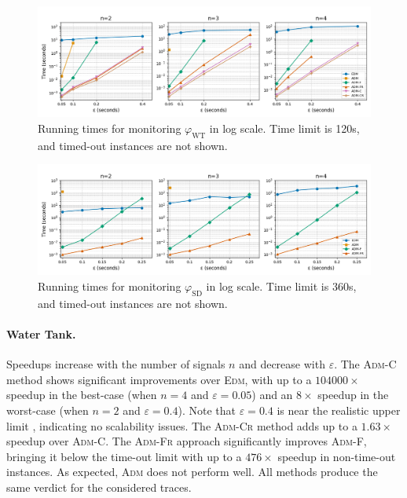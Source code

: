 \begin{figure}[t]
	\begin{center}
		\includegraphics[width=\linewidth]{wt_newnames.png}
		\caption{Running times for monitoring $\varphi_{\text{WT}}$ in log scale. Time limit is 120s, and timed-out instances are not shown.}
	\end{center}
\end{figure}
\begin{figure}[t]
	\begin{center}
		\includegraphics[width=\linewidth]{ms_newnames.png}
		\caption{Running times for monitoring $\varphi_{\text{SD}}$ in log scale. Time limit is 360s, and timed-out instances are not shown.}
	\end{center}
\end{figure}

\paragraph*{Water Tank.}
Speedups increase with the number of signals \(n\) and decrease with \(\varepsilon\).
The \textsc{Adm-C} method shows significant improvements over \textsc{Edm}, with up to a $104000\times$ speedup in the best-case (when \(n=4\) and \(\varepsilon=0.05\)) and an $8\times$ speedup in the worst-case (when \(n=2\) and \(\varepsilon=0.4\)).
Note that \(\varepsilon=0.4\) is near the realistic upper limit \cite{MomtazAB23}, indicating no scalability issues.
The \textsc{Adm-Cr} method adds up to a $1.63\times$ speedup over \textsc{Adm-C}.
The \textsc{Adm-Fr} approach significantly improves \textsc{Adm-F}, bringing it below the time-out limit with up to a $476\times$ speedup in non-time-out instances.
As expected, \textsc{Adm} does not perform well.
All methods produce the same verdict for the considered traces.



